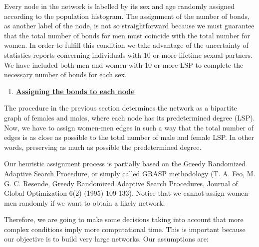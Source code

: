 Every node in the network is labelled by its sex and age randomly assigned
according to the population histogram. The assignment of the number of bonds, as another label of the node, is not so straightforward because we must guarantee that the total number of bonds for men must coincide with the total number for women. In order to fulfill this condition we take advantage of the uncertainty of statistics reports concerning individuals with 10 or more lifetime sexual partners. We have included both men and women with 10 or more LSP to complete the necessary number of bonds for each sex.

\begin{enumerate}[resume]
	\item \underline{\textbf{Assigning the bonds to each node}}
\end{enumerate}
The procedure in the previous section determines the network as a bipartite graph of females and males, where each node has its predetermined degree (LSP). Now, we have to assign women-men edges in such a way that the total number of edges is as close as possible to the total number of male and female LSP. In other words, preserving as much as possible the predetermined degree.

Our heuristic assignment process is partially based on the Greedy Randomized Adaptive Search Procedure, or simply called GRASP methodology (T. A. Feo, M. G. C. Resende, Greedy Randomized Adaptive Search Procedures, Journal of Global Optimization 6(2) (1995) 109-133). Notice that we cannot assign women-men randomly if we want to obtain a likely network.

Therefore, we are going to make some decisions taking into account that more complex conditions imply more computational time. This is important because our objective is to build very large networks. Our assumptions are:

